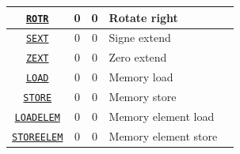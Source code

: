 \documentclass{article}
\begin{document}
\begin{table}[h]
\begin{center}
\begin{tabular}{|c|c|c|l|l}
\hline
\hyperref[sec:ROTR]{\texttt{ROTR}} & 0 & 0 & Rotate right\\
\hline
\hyperref[sec:SEXT]{\texttt{SEXT}} & 0 & 0 & Signe extend\\
\hline
\hyperref[sec:ZEXT]{\texttt{ZEXT}} & 0 & 0 & Zero extend\\
\hline
\hyperref[sec:LOAD]{\texttt{LOAD}} & 0 & 0 & Memory load\\
\hline
\hyperref[sec:STORE]{\texttt{STORE}} & 0 & 0 & Memory store\\
\hline
\hyperref[sec:LOADELEM]{\texttt{LOADELEM}} & 0 & 0 & Memory element load\\
\hline
\hyperref[sec:STOREELEM]{\texttt{STOREELEM}} & 0 & 0 & Memory element store\\
\hline
\end{tabular}
\end{center}
\end{table}


\clearpage




\end{document}
